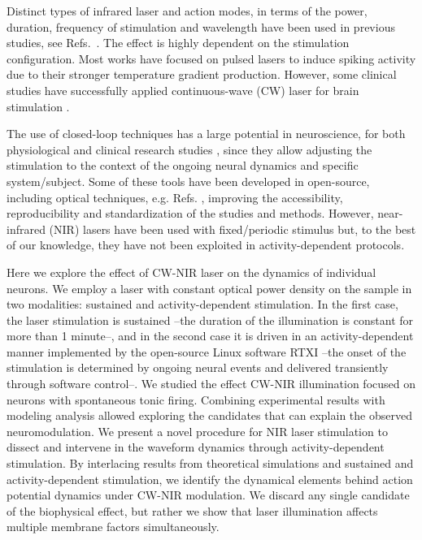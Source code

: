 Distinct types of infrared laser and action modes, in terms of the power, duration, frequency of stimulation and wavelength have been used in previous studies, see Refs.~. The effect is highly dependent on the stimulation configuration. Most works have focused on pulsed lasers to induce spiking activity due to their stronger temperature gradient production. However, some clinical studies have successfully applied continuous-wave (CW) laser for brain stimulation \cite{Saucedo2021}.

The use of closed-loop techniques has a large potential in neuroscience, for both physiological and clinical research studies \cite{potter2010, Chamorro2012, couto_firing_2015,Lareo2016,Varona2016a,zrenner2016closed,Reyes-Sanchez2020,REYESSANCHEZ2023}, since they allow adjusting the stimulation to the context of the ongoing neural dynamics and specific system/subject. Some of these tools have been developed in open-source, including optical techniques, e.g.  Refs. , improving the accessibility, reproducibility and standardization of the studies and methods. However, near-infrared (NIR) lasers have been used with fixed/periodic stimulus but, to the best of our knowledge, they have not been exploited in activity-dependent protocols. 

Here we explore the effect of CW-NIR laser on the dynamics of individual neurons. We employ a laser with constant optical power density on the sample in two modalities: sustained and activity-dependent stimulation. In the first case, the laser stimulation is sustained --the duration of the illumination is constant for more than 1 minute--, and in the second case it is driven in an activity-dependent manner implemented by the open-source Linux software RTXI\cite{Patel2017} --the onset of the stimulation is determined by ongoing neural events and delivered transiently through software control--.
We studied the effect CW-NIR illumination focused on neurons with spontaneous tonic firing. Combining experimental results with modeling analysis allowed exploring the candidates that can explain the observed neuromodulation. We present a novel procedure for NIR laser stimulation to dissect and intervene in the waveform dynamics through activity-dependent stimulation. By interlacing results from theoretical simulations and sustained and activity-dependent stimulation, we identify the dynamical elements behind action potential dynamics under CW-NIR modulation. We discard any single candidate of the biophysical effect, but rather we show that laser illumination affects multiple membrane factors simultaneously.


